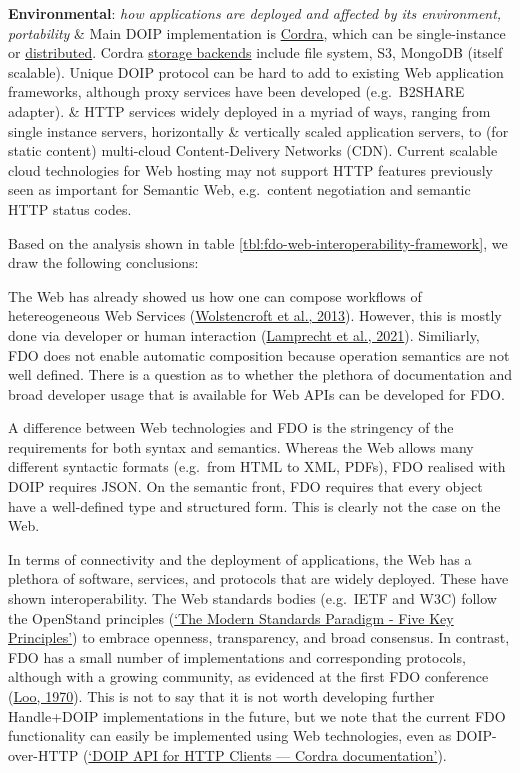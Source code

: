 \begin{longtable}[]
\textbf{Environmental}: \emph{how applications are deployed and affected by its environment, portability} & Main DOIP implementation is \href{https://www.cordra.org/}{Cordra}, which can be single-instance or \href{https://www.cordra.org/documentation/configuration/distributed-deployment.html}{distributed}. Cordra \href{https://www.cordra.org/documentation/configuration/storage-backends.html}{storage backends} include file system, S3, MongoDB (itself scalable). Unique DOIP protocol can be hard to add to existing Web application frameworks, although proxy services have been developed (e.g.~B2SHARE adapter). & HTTP services widely deployed in a myriad of ways, ranging from single instance servers, horizontally \& vertically scaled application servers, to (for static content) multi-cloud Content-Delivery Networks (CDN). Current scalable cloud technologies for Web hosting may not support HTTP features previously seen as important for Semantic Web, e.g.~content negotiation and semantic HTTP status codes. \\
\bottomrule
\end{longtable}

Based on the analysis shown in table \ref{tbl:fdo-web-interoperability-framework}, we draw the following conclusions:

The Web has already showed us how one can compose workflows of hetereogeneous Web Services (\protect\hyperlink{ref-39K3yHT3}{Wolstencroft et al., 2013}). However, this is mostly done via developer or human interaction (\protect\hyperlink{ref-iYh1wFBt}{Lamprecht et al., 2021}). Similiarly, FDO does not enable automatic composition because operation semantics are not well defined. There is a question as to whether the plethora of documentation and broad developer usage that is available for Web APIs can be developed for FDO.

A difference between Web technologies and FDO is the stringency of the requirements for both syntax and semantics. Whereas the Web allows many different syntactic formats (e.g.~from HTML to XML, PDFs), FDO realised with DOIP requires JSON. On the semantic front, FDO requires that every object have a well-defined type and structured form. This is clearly not the case on the Web.

In terms of connectivity and the deployment of applications, the Web has a plethora of software, services, and protocols that are widely deployed. These have shown interoperability. The Web standards bodies (e.g.~IETF and W3C) follow the OpenStand principles (\protect\hyperlink{ref-hxtgCGjY}{{`The Modern Standards Paradigm - Five Key Principles'}}) to embrace openness, transparency, and broad consensus. In contrast, FDO has a small number of implementations and corresponding protocols, although with a growing community, as evidenced at the first FDO conference (\protect\hyperlink{ref-jrZe6Esu}{Loo, 1970}). This is not to say that it is not worth developing further Handle+DOIP implementations in the future, but we note that the current FDO functionality can easily be implemented using Web technologies, even as DOIP-over-HTTP (\protect\hyperlink{ref-p7nwRj8E}{{`DOIP API for HTTP Clients --- Cordra documentation'}}).

